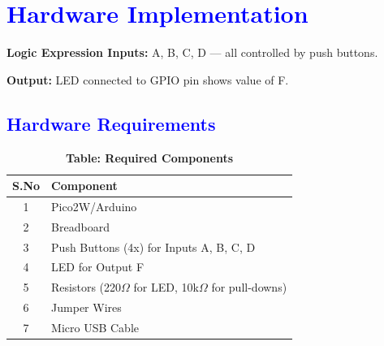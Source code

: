 \documentclass[twocolumn]{article}
\begin{document}
\section*{\textcolor{blue}{Hardware Implementation }}

\textbf{Logic Expression Inputs:} A, B, C, D — all controlled by push buttons.

\textbf{Output:} LED connected to GPIO pin shows value of F.

\subsection*{\textcolor{blue}{Hardware Requirements}}

\begin{table}[h]
\centering
\renewcommand{\arraystretch}{1.3}
\begin{tabular}{|c|l|}
\hline
\textbf{S.No} & \textbf{Component} \\ \hline
1 & Pico2W/Arduino \\
2 & Breadboard \\
3 & Push Buttons (4x) for Inputs A, B, C, D \\
4 & LED for Output F \\
5 & Resistors (220$\Omega$ for LED, 10k$\Omega$ for pull-downs) \\
6 & Jumper Wires \\
7 & Micro USB Cable \\
\hline
\end{tabular}
\caption*{\textbf{Table: Required Components}}
\end{table}

\end{document}
